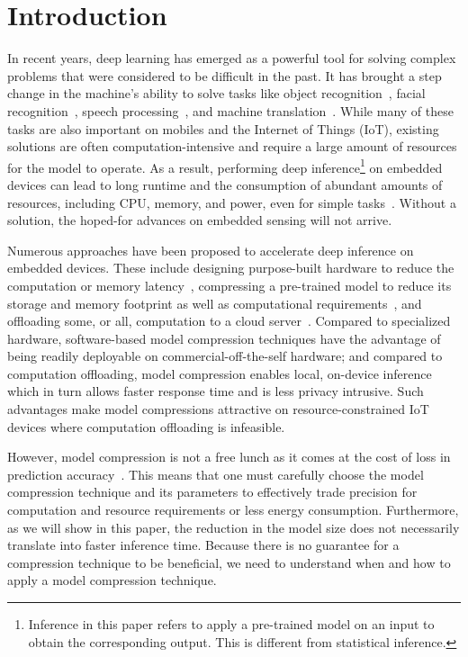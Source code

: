 \section{Introduction}
In recent years, deep learning has emerged as a powerful tool for solving complex problems that were considered to be difficult in the
past. It has brought a step change in the machine's ability to solve tasks like object recognition~\cite{donahue14,he2016deep}, facial
recognition~\cite{parkhi2015deep,sun2014deep}, speech processing~\cite{pmlrv48amodei16}, and machine translation~\cite{bahdanau2014neural}.
While many of these tasks are also important on mobiles and the Internet of Things (IoT), existing solutions are often
computation-intensive and require a large amount of resources for the model to operate. As a result, performing deep
inference\footnote{Inference in this paper refers to apply a pre-trained model on an input to obtain the corresponding output. This is
different from statistical inference.} on embedded devices can lead to long runtime and the consumption of abundant amounts of resources,
including CPU, memory, and power, even for simple tasks~\cite{CanzianiPC16}. Without a solution,
 the hoped-for advances on embedded sensing will not arrive.


Numerous approaches have been proposed to accelerate deep inference on embedded devices. These include designing purpose-built hardware to
reduce the computation or memory latency~\cite{georgiev2017low}, compressing a pre-trained model to reduce its storage and memory footprint
as well as computational requirements~\cite{han2016eie}, and offloading some, or all, computation to a cloud
server~\cite{Kang2017neurosurgeon,teerapittayanon2017distributed}. Compared to specialized hardware, software-based model compression
techniques have the advantage of being readily deployable on commercial-off-the-self hardware; and compared to computation offloading,
model compression enables local, on-device inference which in turn allows faster response time and is less privacy intrusive. Such
advantages make model compressions attractive on resource-constrained IoT devices where computation offloading is infeasible.


However, model compression is not a free lunch as it comes at the cost of loss in prediction accuracy~\cite{Cheng2017A}. This
means that one must carefully choose the model compression technique and its parameters to effectively trade precision for computation and
resource requirements or less energy consumption. Furthermore, as we will show in this paper, the reduction in the model size does not
necessarily translate into faster inference time. Because there is no guarantee for a compression technique to be beneficial, we need to
understand when and how to apply a model compression technique.

